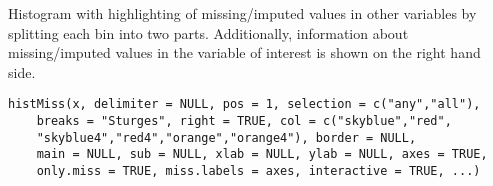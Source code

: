 %
\begin{Description}\relax
Histogram with highlighting of missing/imputed values in other variables by 
splitting each bin into two parts.  Additionally, information about 
missing/imputed values in the variable of interest is shown on the right hand 
side.
\end{Description}
%
\begin{Usage}
\begin{verbatim}
histMiss(x, delimiter = NULL, pos = 1, selection = c("any","all"),
    breaks = "Sturges", right = TRUE, col = c("skyblue","red",
    "skyblue4","red4","orange","orange4"), border = NULL,
    main = NULL, sub = NULL, xlab = NULL, ylab = NULL, axes = TRUE,
    only.miss = TRUE, miss.labels = axes, interactive = TRUE, ...)
\end{verbatim}
\end{Usage}
%
